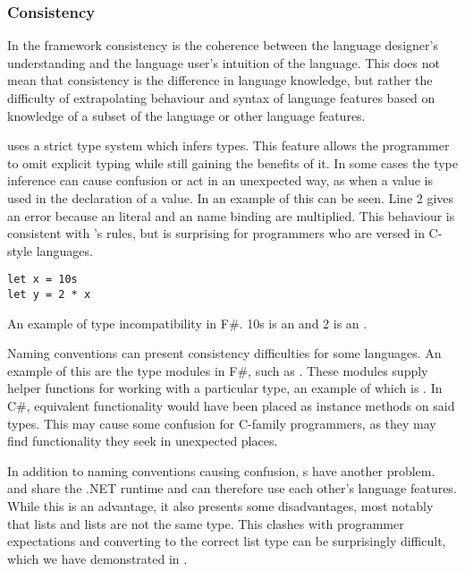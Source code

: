 \subsubsection{Consistency}
In the \cognitive framework consistency is the coherence between the language designer's understanding and the language user's intuition of the language\cite{green1996usability}. This does not mean that consistency is the difference in language knowledge, but rather the difficulty of extrapolating behaviour and syntax of language features based on knowledge of a subset of the language or other language features.

\fs uses a strict type system which infers types. This feature allows the programmer to omit explicit typing while still gaining the benefits of it. In some cases the type inference can cause confusion or act in an unexpected way, as when a  value is used in the declaration of a  value. In  an example of this can be seen. Line 2 gives an error because an  literal and an  name binding are multiplied. This behaviour is consistent with \fs's rules, but is surprising for programmers who are versed in C-style languages.

\begin{listing}[H]
\begin{verbatim}
let x = 10s
let y = 2 * x
\end{verbatim}
\caption{An example of type incompatibility in F\#. 10s is an  and 2 is an .}
\label{lst:type-incompat}
\end{listing}

Naming conventions can present consistency difficulties for some languages. An example of this are the type modules in F\#, such as . These modules supply helper functions for working with a particular type, an example of which is . In C\#, equivalent functionality would have been placed as instance methods on said types. This may cause some confusion for C-family programmers, as they may find functionality they seek in unexpected places.

In addition to naming conventions causing confusion, s have another problem. \fs and \cs share the .NET runtime and can therefore use each other's language features. While this is an advantage, it also presents some disadvantages, most notably that \fs lists and \cs lists are not the same type. This clashes with programmer expectations and converting to the correct list type can be surprisingly difficult, which we have demonstrated in .

